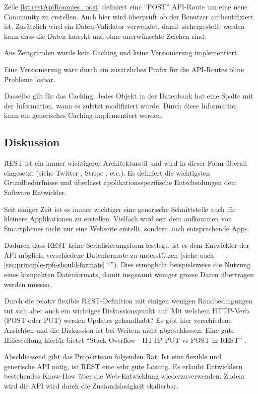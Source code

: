 Zeile \autoref{lst:restApiRoomies_post} definiert eine ``POST'' API-Route um eine neue Community zu erstellen. Auch hier wird überprüft ob der Benutzer authentifiziert ist. Zusätzlich wird ein Daten-Validator verwendet, damit sichergestellt werden kann dass die Daten korrekt und ohne unerwünschte Zeichen sind.

Aus Zeitgründen wurde kein Caching und keine Versionierung implementiert.

Eine Versionierung wäre durch ein zusätzliches Präfix für die API-Routes ohne Probleme lösbar.

Dasselbe gilt für das Caching. Jedes Objekt in der Datenbank hat eine Spalte mit der Information, wann es zuletzt modifiziert wurde. Durch diese Information kann ein generisches Caching implementiert werden.

\subsection*{Diskussion}

\gls{REST} ist ein immer wichtigerer Architekturstil und wird in dieser Form überall eingesetzt (siehe Twitter \cite{TwitterAPI}, Stripe \cite{StripeAPI}, etc.). Es definiert die wichtigsten Grundbedürfnisse und überlässt applikationsspezifische Entscheidungen dem Software Entwickler.

Seit einiger Zeit ist es immer wichtiger eine generische Schnittstelle auch für kleinere Applikationen zu erstellen. Vielfach wird seit dem aufkommen von Smartphones nicht nur eine Webseite erstellt, sondern auch entsprechende Apps.

Dadurch dass \gls{REST} keine Serialisierungsform festlegt, ist es dem Entwickler der API möglich, verschiedene Datenformate zu unterstützen (siehe auch \ref{sec:principle-rp6-should-formats} ``''). Dies ermöglicht beispielsweise die Nutzung eines kompakten Datenformats, damit insgesamt weniger grosse Daten übertragen werden müssen.

Durch die relativ flexible REST-Definition mit einigen wenigen Randbedingungen tut sich aber auch ein wichtiger Diskussionspunkt auf: Mit welchem HTTP-Verb (POST oder PUT) werden Updates gehandhabt? Es gibt hier verschiedene Ansichten und die Diskussion ist bei Weitem nicht abgeschlossen. Eine gute Hilfestellung hierfür bietet ``Stack Overflow - HTTP PUT vs POST in REST'' \cite{StackoverflowPUTvsPOST}.

Abschliessend gibt das Projektteam folgenden Rat: Ist eine flexible und generische API nötig, ist \gls{REST} eine sehr gute Lösung. Es erlaubt Entwicklern bestehendes Know-How über die Web-Entwicklung wiederzuverwenden. Zudem wird die API wird durch die Zustandslosigkeit skalierbar.